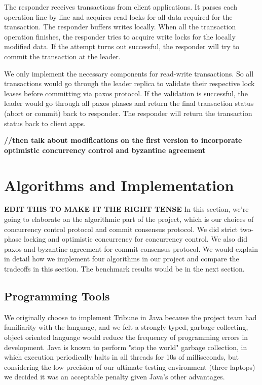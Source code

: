 \documentclass[10pt,twocolumn]{article}
\begin{document}
The responder receives transactions from client applications. It parses each operation line by line and acquires read locks for all data required for the transaction. The responder buffers writes locally. When all the transaction operation finishes, the responder tries to acquire write locks for the locally modified data. If the attempt turns out successful, the responder will try to commit the transaction at the leader. 

We only implement the necessary components for read-write transactions. So all transactions would go through the leader replica to validate their respective lock leases before committing via paxos protocol. If the validation is successful, the leader would go through all paxos phases and return the final transaction status (abort or commit) back to responder. The responder will return the transaction status back to client apps.


\textbf{//then talk about modifications on the first version to incorporate optimistic concurrency control and byzantine agreement}


\section{Algorithms and Implementation}

\textbf{EDIT THIS TO MAKE IT THE RIGHT TENSE}
In this section, we're going to elaborate on the algorithmic part of the project, which is our choices of concurrency control protocol and commit consensus protocol. We did strict two-phase locking and optimistic concurrency for concurrency control. We also did paxos and byzantine agreement for commit consensus protocol. We would explain in detail how we implement four algorithms in our project and compare the tradeoffs in this section. The benchmark results would be in the next section.

\subsection{Programming Tools}

We originally choose to implement Tribune in Java because the project team had familiarity with the language, and we felt a strongly typed, garbage collecting, object oriented language would reduce the frequency of programming errors in development. Java is known to perform "stop the world" garbage collection, in which execution periodically halts in all threads for 10s of milliseconds, but considering the low precision of our ultimate testing environment (three laptops) we decided it was an acceptable penalty given Java's other advantages.
\end{document}
